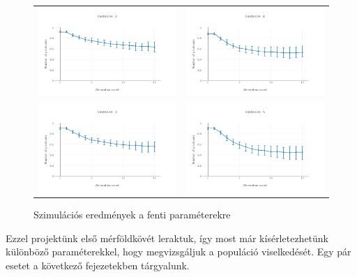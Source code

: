 \begin{frame}
\begin{figure}[h]
	\centering
	\begin{tabular}{cc}
		\includegraphics[width=0.47\linewidth]{images/dist2}
		&
		\includegraphics[width=0.47\linewidth]{images/dist4}
		\\
		\includegraphics[width=0.47\linewidth]{images/dist3}
		&
		\includegraphics[width=0.47\linewidth]{images/dist5}
		\\
	\end{tabular}
	\caption{Szimulációs eredmények a fenti paraméterekre}
	\label{fig:DistChange}
\end{figure}

Ezzel projektünk első mérföldkövét leraktuk, így most már kísérletezhetünk különböző paraméterekkel, hogy megvizsgáljuk a populáció viselkedését. Egy pár esetet a következő fejezetekben tárgyalunk.
\end{frame}

